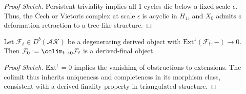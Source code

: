 \documentclass[11pt]{article}
\begin{document}
\begin{proof}[Proof Sketch]
Persistent triviality implies all 1-cycles die below a fixed scale $\epsilon$.  
Thus, the Čech or Vietoris complex at scale $\epsilon$ is acyclic in $H_1$, and $X_0$ admits a deformation retraction to a tree-like structure.
\end{proof}

\begin{lemma}
Let $\mathcal{F}_t \in D^b(\mathcal{AK})$ be a degenerating derived object with $\mathrm{Ext}^1(\mathcal{F}_t, -) \to 0$.  
Then $\mathcal{F}_0 := \colim_{t \to 0} \mathcal{F}_t$ is a derived-final object.
\end{lemma}

\begin{proof}[Proof Sketch]
Ext$^1 = 0$ implies the vanishing of obstructions to extensions.  
The colimit thus inherits uniqueness and completeness in its morphism class, consistent with a derived finality property in triangulated structure.
\end{proof}
\end{document}

